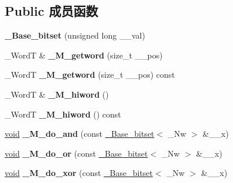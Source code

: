 \subsection*{Public 成员函数}
\begin{DoxyCompactItemize}
\item 
\mbox{\label{struct___base__bitset_a7d63d99ffe75fc652d94082577a32a3b}} 
{\bfseries \+\_\+\+Base\+\_\+bitset} (unsigned long \+\_\+\+\_\+val)
\item 
\mbox{\label{struct___base__bitset_a9bf26460ddde81900fc4c6542ff4eb1e}} 
\+\_\+\+WordT \& {\bfseries \+\_\+\+M\+\_\+getword} (size\+\_\+t \+\_\+\+\_\+pos)
\item 
\mbox{\label{struct___base__bitset_adcac7c7246bc554fbe9ad4462f75da34}} 
\+\_\+\+WordT {\bfseries \+\_\+\+M\+\_\+getword} (size\+\_\+t \+\_\+\+\_\+pos) const
\item 
\mbox{\label{struct___base__bitset_a8c6df8f5032813ab60f5e279ca61f947}} 
\+\_\+\+WordT \& {\bfseries \+\_\+\+M\+\_\+hiword} ()
\item 
\mbox{\label{struct___base__bitset_a22016263f9b78828fc29622735cb92cf}} 
\+\_\+\+WordT {\bfseries \+\_\+\+M\+\_\+hiword} () const
\item 
\mbox{\label{struct___base__bitset_ac39ff309f7e735b5feba8cc93694944f}} 
\hyperlink{interfacevoid}{void} {\bfseries \+\_\+\+M\+\_\+do\+\_\+and} (const \hyperlink{struct___base__bitset}{\+\_\+\+Base\+\_\+bitset}$<$ \+\_\+\+Nw $>$ \&\+\_\+\+\_\+x)
\item 
\mbox{\label{struct___base__bitset_a0065ee79a9e45fee5cf3cfa3f687fb3d}} 
\hyperlink{interfacevoid}{void} {\bfseries \+\_\+\+M\+\_\+do\+\_\+or} (const \hyperlink{struct___base__bitset}{\+\_\+\+Base\+\_\+bitset}$<$ \+\_\+\+Nw $>$ \&\+\_\+\+\_\+x)
\item 
\mbox{\label{struct___base__bitset_a574ded187d04e78ef3bcc44aa58f6c24}} 
\hyperlink{interfacevoid}{void} {\bfseries \+\_\+\+M\+\_\+do\+\_\+xor} (const \hyperlink{struct___base__bitset}{\+\_\+\+Base\+\_\+bitset}$<$ \+\_\+\+Nw $>$ \&\+\_\+\+\_\+x)

\end{DoxyCompactItemize}
